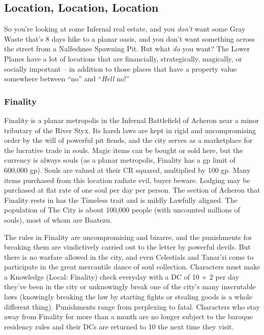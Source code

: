 \subsection{Location, Location, Location}

So you're looking at some Infernal real estate, and you \textit{don't} want some Gray Waste that's 8 days hike to a planar oasis, and you don't want something across the street from a Nalfeshnee Spawning Pit. But what \textit{do} you want? The Lower Planes have a lot of locations that are financially, strategically, magically, or socially important -- in addition to those places that have a property value somewhere between ``no'' and ``\textit{Hell} no!''

\subsubsection{Finality}

Finality is a planar metropolis in the Infernal Battlefield of Acheron near a minor tributary of the River Styx. Its harsh laws are kept in rigid and uncompromising order by the will of powerful pit fiends, and the city serves as a marketplace for the lucrative trade in souls. Magic items can be bought or sold here, but the currency is always souls (as a planar metropolis, Finality has a gp limit of 600,000 gp). Souls are valued at their CR squared, multiplied by 100 gp. Many items purchased from this location radiate evil, buyer beware. Lodging may be purchased at flat rate of one soul per day per person. The section of Acheron that Finality rests in has the Timeless trait and is mildly Lawfully aligned. The population of The City is about 100,000 people (with uncounted millions of souls), most of whom are Baatezu.

The rules in Finality are uncompromising and bizarre, and the punishments for breaking them are vindictively carried out to the letter by powerful devils. But there is no warfare allowed in the city, and even Celestials and Tanar'ri come to participate in the great mercantile dance of soul collection. Characters must make a Knowledge (Local: Finality) check everyday with a DC of 10 + 2 per day they've been in the city or unknowingly break one of the city's many inscrutable laws (knowingly breaking the law by starting fights or stealing goods is a whole different thing). Punishments range from perplexing to fatal. Characters who stay away from Finality for more than a month are no longer subject to the baroque residency rules and their DCs are returned to 10 the next time they visit.

